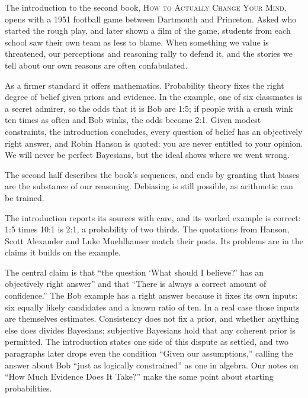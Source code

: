 \begin{afterword}
\summaryhead

The introduction to the second book, \textsc{How to Actually Change Your Mind}, opens with a 1951 football game between Dartmouth and Princeton. Asked who started the rough play, and later shown a film of the game, students from each school saw their own team as less to blame. When something we value is threatened, our perceptions and reasoning rally to defend it, and the stories we tell about our own reasons are often confabulated.

As a firmer standard it offers mathematics. Probability theory fixes the right degree of belief given priors and evidence. In the example, one of six classmates is a secret admirer, so the odds that it is Bob are 1:5; if people with a crush wink ten times as often and Bob winks, the odds become 2:1. Given modest constraints, the introduction concludes, every question of belief has an objectively right answer, and Robin Hanson is quoted: you are never entitled to your opinion. We will never be perfect Bayesians, but the ideal shows where we went wrong.

The second half describes the book's sequences, and ends by granting that biases are the substance of our reasoning. Debiasing is still possible, as arithmetic can be trained.

\responsehead

The introduction reports its sources with care, and its worked example is correct: 1:5 times 10:1 is 2:1, a probability of two thirds. The quotations from Hanson, Scott Alexander and Luke Muehlhauser match their posts. Its problems are in the claims it builds on the example.

The central claim is that ``the question `What should I believe?' has an objectively right answer'' and that ``There is always a correct amount of confidence.'' The Bob example has a right answer because it fixes its own inputs: six equally likely candidates and a known ratio of ten. In a real case those inputs are themselves estimates. Consistency does not fix a prior, and whether anything else does divides Bayesians; subjective Bayesians hold that any coherent prior is permitted. The introduction states one side of this dispute as settled, and two paragraphs later drops even the condition ``Given our assumptions,'' calling the answer about Bob ``just as logically constrained'' as one in algebra. Our notes on ``How Much Evidence Does It Take?'' make the same point about starting probabilities.


\end{afterword}
